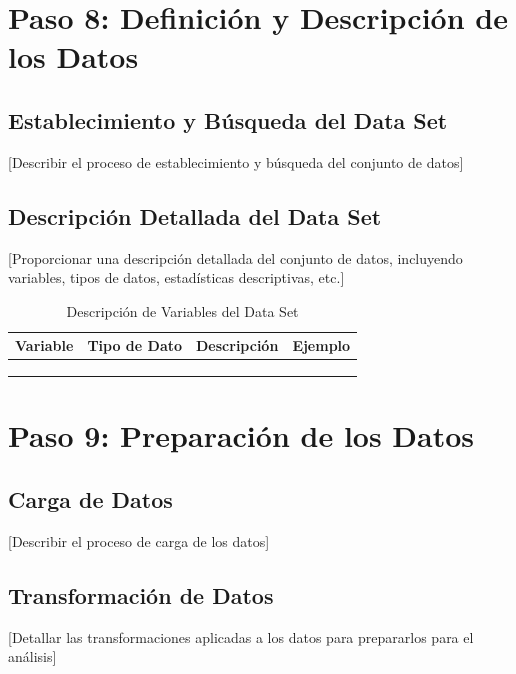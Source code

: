 \documentclass[12pt,letterpaper]{report}
\begin{document}
\section{Paso 8: Definición y Descripción de los Datos}

\subsection{Establecimiento y Búsqueda del Data Set}
[Describir el proceso de establecimiento y búsqueda del conjunto de datos]

\subsection{Descripción Detallada del Data Set}
[Proporcionar una descripción detallada del conjunto de datos, incluyendo variables, tipos de datos, estadísticas descriptivas, etc.]

\begin{table}[H]
    \centering
    \begin{tabularx}{\textwidth}{|X|X|X|X|}
        \hline
        \textbf{Variable} & \textbf{Tipo de Dato} & \textbf{Descripción} & \textbf{Ejemplo} \\
        \hline
        & & & \\
        \hline
        & & & \\
        \hline
        & & & \\
        \hline
    \end{tabularx}
    \caption{Descripción de Variables del Data Set}
\end{table}

\section{Paso 9: Preparación de los Datos}

\subsection{Carga de Datos}
[Describir el proceso de carga de los datos]

\subsection{Transformación de Datos}
[Detallar las transformaciones aplicadas a los datos para prepararlos para el análisis]
\end{document}

